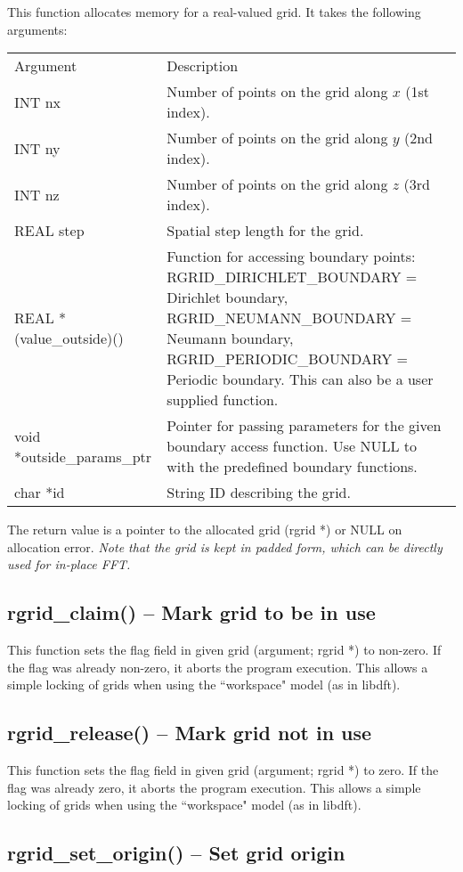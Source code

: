 \documentclass[12pt,letterpaper]{report}
\begin{document}
This function allocates memory for a real-valued grid. It takes the following arguments:
\begin{longtable}{p{} p{}}
Argument & Description\\
\cline{1-2}
INT nx & Number of points on the grid along $x$ (1st index).\\
INT ny & Number of points on the grid along $y$ (2nd index).\\
INT nz & Number of points on the grid along $z$ (3rd index).\\
REAL step & Spatial step length for the grid.\\
REAL *(value\_outside)() & Function for accessing boundary points: RGRID\_DIRICHLET\_BOUNDARY = Dirichlet boundary, RGRID\_NEUMANN\_BOUNDARY = Neumann boundary, RGRID\_PERIODIC\_BOUNDARY  = Periodic boundary. This can also be a user supplied function.\\
void *outside\_params\_ptr & Pointer for passing parameters for the given boundary access function. Use NULL to with the predefined boundary functions.\\
char *id & String ID describing the grid.
\end{longtable}
\noindent
The return value is a pointer to the allocated grid (rgrid *) or NULL on allocation error. \textit{Note that the grid is kept in padded form, which can be directly used for in-place FFT.}

\subsection{rgrid\_claim() -- Mark grid to be in use}

This function sets the flag field in given grid (argument; rgrid *) to non-zero. If the flag was already non-zero, it aborts the program execution. This allows a simple locking of grids when using the ``workspace" model (as in libdft).

\subsection{rgrid\_release() -- Mark grid not in use}

This function sets the flag field in given grid (argument; rgrid *) to zero. If the flag was already zero, it aborts the program execution. This allows a simple locking of grids when using the ``workspace" model (as in libdft).

\subsection{rgrid\_set\_origin() -- Set grid origin}
\end{document}
